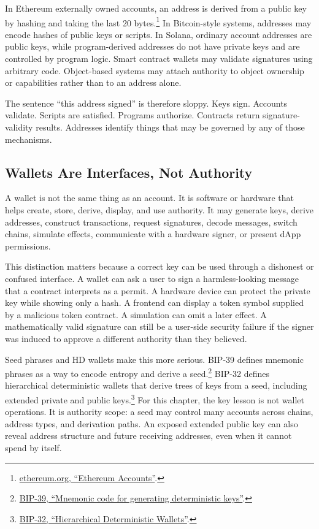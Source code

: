 In Ethereum externally owned accounts, an address is derived from a public key by hashing and taking the last 20 bytes.\footnote{\href{https://ethereum.org/developers/docs/accounts/}{ethereum.org, ``Ethereum Accounts''}.} In Bitcoin-style systems, addresses may encode hashes of public keys or scripts. In Solana, ordinary account addresses are public keys, while program-derived addresses do not have private keys and are controlled by program logic. Smart contract wallets may validate signatures using arbitrary code. Object-based systems may attach authority to object ownership or capabilities rather than to an address alone.

The sentence ``this address signed'' is therefore sloppy. Keys sign. Accounts validate. Scripts are satisfied. Programs authorize. Contracts return signature-validity results. Addresses identify things that may be governed by any of those mechanisms.

\subsection{Wallets Are Interfaces, Not Authority}

A wallet is not the same thing as an account. It is software or hardware that helps create, store, derive, display, and use authority. It may generate keys, derive addresses, construct transactions, request signatures, decode messages, switch chains, simulate effects, communicate with a hardware signer, or present dApp permissions.

This distinction matters because a correct key can be used through a dishonest or confused interface. A wallet can ask a user to sign a harmless-looking message that a contract interprets as a permit. A hardware device can protect the private key while showing only a hash. A frontend can display a token symbol supplied by a malicious token contract. A simulation can omit a later effect. A mathematically valid signature can still be a user-side security failure if the signer was induced to approve a different authority than they believed.

Seed phrases and HD wallets make this more serious. BIP-39 defines mnemonic phrases as a way to encode entropy and derive a seed.\footnote{\href{https://github.com/bitcoin/bips/blob/master/bip-0039.mediawiki}{BIP-39, ``Mnemonic code for generating deterministic keys''}.} BIP-32 defines hierarchical deterministic wallets that derive trees of keys from a seed, including extended private and public keys.\footnote{\href{https://github.com/bitcoin/bips/blob/master/bip-0032.mediawiki}{BIP-32, ``Hierarchical Deterministic Wallets''}.} For this chapter, the key lesson is not wallet operations. It is authority scope: a seed may control many accounts across chains, address types, and derivation paths. An exposed extended public key can also reveal address structure and future receiving addresses, even when it cannot spend by itself.

